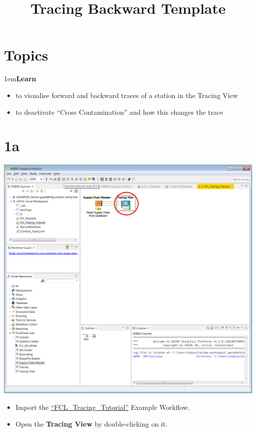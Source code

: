 \documentclass[10pt]{beamer}
\title{Tracing Backward Template}
\date{}
\begin{document}
\maketitle

\section{Topics}
\begin{frame}
\leftskip1em\textbf{Learn}
	\begin{itemize}
		\item to visualise forward and backward traces of a station in the Tracing View
		\item to deactivate “Cross Contamination” and how this changes the trace
	\end{itemize}
\end{frame}

\section{1a}
\begin{frame}
	\begin{center}
  		\includegraphics[height=0.6\textheight]{1a.png}
	\end{center}
	\begin{itemize}
		\item Import the  \textcolor{blue}{\underline{\href{https://github.com/SiLeBAT/BfROpenLabResources/raw/master/GitHubPages/workflows/FCL\_Tracing\_Tutorial.knwf}{``FCL\_Tracing\_Tutorial''}}} Example Workflow.
		\item Open the \textbf{Tracing View} by double-clicking on it.
	\end{itemize}
\end{frame}
\end{document}
